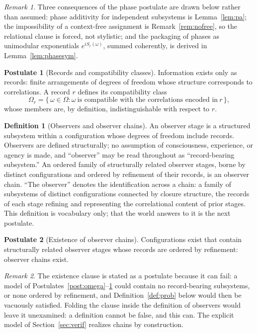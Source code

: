 \documentclass[11pt]{article}
\theoremstyle{definition}
\newtheorem{postulate}{Postulate}
\newtheorem{definition}{Definition}
\theoremstyle{remark}
\newtheorem{remark}{Remark}
\begin{document}
\begin{remark}
Three consequences of the phase postulate are drawn below rather than assumed: phase additivity for independent subsystems is Lemma~\ref{lem:pa}; the impossibility of a context-free assignment is Remark~\ref{rem:nofree}, so the relational clause is forced, not stylistic; and the packaging of phases as unimodular exponentials $e^{iS_r(\omega)}$, summed coherently, is derived in Lemma~\ref{lem:phasesym}.
\end{remark}

\begin{postulate}[Records and compatibility classes]\label{post:records}
Information exists only as records: finite arrangements of degrees of freedom whose structure corresponds to correlations. A record $r$ defines its compatibility class
\begin{equation}
\Omega_r = \{\, \omega \in \Omega : \omega \ \text{is compatible with the correlations encoded in}\ r \,\},
\end{equation}
whose members are, by definition, indistinguishable with respect to $r$.
\end{postulate}

\begin{definition}[Observers and observer chains]\label{def:observer}
An observer stage is a structured subsystem within a configuration whose degrees of freedom include records. Observers are defined structurally; no assumption of consciousness, experience, or agency is made, and ``observer'' may be read throughout as ``record-bearing subsystem.'' An ordered family of structurally related observer stages, borne by distinct configurations and ordered by refinement of their records, is an observer chain. ``The observer'' denotes the identification across a chain: a family of subsystems of distinct configurations connected by closure structure, the records of each stage refining and representing the correlational content of prior stages. This definition is vocabulary only; that the world answers to it is the next postulate.
\end{definition}

\begin{postulate}[Existence of observer chains]\label{post:chains}
Configurations exist that contain structurally related observer stages whose records are ordered by refinement: observer chains exist.
\end{postulate}

\begin{remark}
The existence clause is stated as a postulate because it can fail: a model of Postulates~\ref{post:omega}--\ref{post:records} could contain no record-bearing subsystems, or none ordered by refinement, and Definition~\ref{def:prob} below would then be vacuously satisfied. Folding the clause inside the definition of observers would leave it unexamined: a definition cannot be false, and this can. The explicit model of Section~\ref{sec:verif} realizes chains by construction.
\end{remark}
\end{document}
